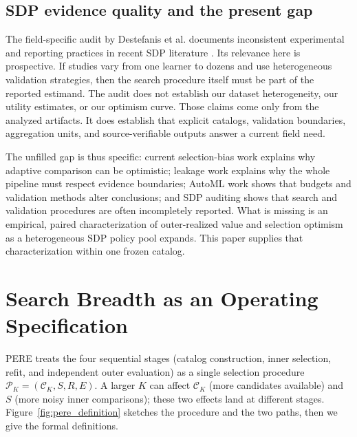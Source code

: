 \documentclass[referee]{USG}
\begin{document}
\subsection{SDP evidence quality and the present gap}
The field-specific audit by Destefanis et al. documents inconsistent experimental and reporting practices in recent SDP literature \cite{destefanis2026audit}. Its relevance here is prospective. If studies vary from one learner to dozens and use heterogeneous validation strategies, then the search procedure itself must be part of the reported estimand. The audit does not establish our dataset heterogeneity, our utility estimates, or our optimism curve. Those claims come only from the analyzed artifacts. It does establish that explicit catalogs, validation boundaries, aggregation units, and source-verifiable outputs answer a current field need.

The unfilled gap is thus specific: current selection-bias work explains why adaptive comparison can be optimistic; leakage work explains why the whole pipeline must respect evidence boundaries; AutoML work shows that budgets and validation methods alter conclusions; and SDP auditing shows that search and validation procedures are often incompletely reported. What is missing is an empirical, paired characterization of outer-realized value and selection optimism as a heterogeneous SDP policy pool expands. This paper supplies that characterization within one frozen catalog.

\section{Search Breadth as an Operating Specification}
PERE treats the four sequential stages (catalog construction, inner selection, refit, and independent outer evaluation) as a single selection procedure $\mathcal P_K=(\mathcal C_K,S,R,E)$. A larger $K$ can affect $\mathcal C_K$ (more candidates available) and $S$ (more noisy inner comparisons); these two effects land at different stages. Figure~\ref{fig:pere_definition} sketches the procedure and the two paths, then we give the formal definitions.
\end{document}
